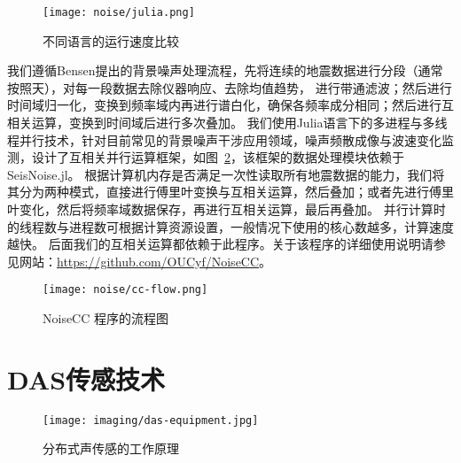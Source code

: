 \begin{figure}[h]
    \centering
    \texttt{[image: noise/julia.png]}
    \caption{不同语言的运行速度比较}
    \label{fig:julia}
\end{figure}



我们遵循Bensen提出的背景噪声处理流程\citep{bensen2007processing}，先将连续的地震数据进行分段（通常按照天），对每一段数据去除仪器响应、去除均值趋势，
进行带通滤波；然后进行时间域归一化，变换到频率域内再进行谱白化，确保各频率成分相同；然后进行互相关运算，变换到时间域后进行多次叠加。
我们使用Julia语言下的多进程与多线程并行技术，针对目前常见的背景噪声干涉应用领域，噪声频散成像与波速变化监测，设计了互相关并行运算框架，如图~\ref{fig:cc-flow}，该框架的数据处理模块依赖于SeisNoise.jl。
根据计算机内存是否满足一次性读取所有地震数据的能力，我们将其分为两种模式，直接进行傅里叶变换与互相关运算，然后叠加；或者先进行傅里叶变化，然后将频率域数据保存，再进行互相关运算，最后再叠加。
并行计算时的线程数与进程数可根据计算资源设置，一般情况下使用的核心数越多，计算速度越快。
后面我们的互相关运算都依赖于此程序。关于该程序的详细使用说明请参见网站：\href{https://github.com/OUCyf/NoiseCC}{https://github.com/OUCyf/NoiseCC}。

\begin{figure}[h]
    \centering
    \texttt{[image: noise/cc-flow.png]}
    \caption{NoiseCC 程序的流程图}
    \label{fig:cc-flow}
\end{figure}





\section{DAS传感技术}

\begin{figure}[h]
    \centering
    \texttt{[image: imaging/das-equipment.jpg]}
    \caption{分布式声传感的工作原理}
    \label{fig:das-equipment}
\end{figure}

